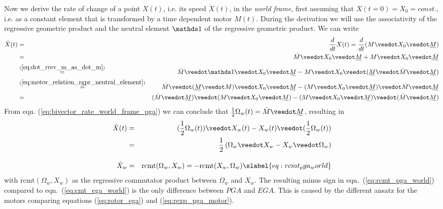 Now we derive the rate of change of a point $X(t)$, i.e. its speed $\dot{X}(t)$, in the
\emph{world frame}, first assuming that $X(t=0) = X_0 = const.$, i.e. as a constant
element that is transformed by a time dependent motor $M(t)$. During the derivation we
will use the associativity of the regressive geometric product and the neutral element
$\ps$ of the regressive geometric product. We can write
\begin{eqnarray*}
   \dot{X}(t) &=& \frac{d}{dt}X(t) =\frac{d}{dt}(M \veedot X_0 \veedot \rrev{M}) \\
              &=& \dot{M} \veedot X_0 \veedot \rrev{M} + M \veedot X_0 \veedot
                  \dot{\rrev{M}} \\
              &\overset{\mathrm{(\ref{eq:dot_rrev_m_as_dot_m})}}{=}& \dot{M} \veedot \ps
                  \veedot X_0 \veedot \rrev{M} -M \veedot X_0 \veedot
                  (\rrev{M}\veedot\dot{M}\veedot\rrev{M}) \\
              &\overset{\mathrm{(\ref{eq:motor_relation_rgpr_neutral_element})}}{=}&
                  \dot{M} \veedot (\rrev{M} \veedot M) \veedot X_0 \veedot \rrev{M} -(M
                  \veedot X_0 \veedot \rrev{M}) \veedot \dot{M} \veedot \rrev{M} \\
              &=& (\dot{M} \veedot \rrev{M}) \veedot (M\veedot X_0 \veedot \rrev{M})
                  -(M\veedot X_0 \veedot\rrev{M}) \veedot (\dot{M} \veedot \rrev{M})
\end{eqnarray*}
From eqn. (\ref{eq:bivector_rate_world_frame_pga}) we can conclude that
$\frac{1}{2}\Omega_w (t) = \dot{M} \veedot \rrev{M}$, resulting in
\begin{eqnarray}
   \dot{X}(t) &=&(\frac{1}{2}\Omega_w(t)) \veedot X_w(t) - X_w(t) \veedot
              (\frac{1}{2}\Omega_w(t)) \nonumber \\
              &=& \frac{1}{2}\left( \Omega_w \veedot X_w - X_w \veedot \Omega_w\right)
              \nonumber \\[10pt]
   \dot{X}_w  &=&  \mathrm{rcmt}(\Omega_w,X_w) = -\mathrm{rcmt}(X_w,\Omega_w)
   \slabel{eq:rcmt_pga_world} 
\end{eqnarray}
with $\mathrm{rcmt}(\Omega_w, X_w)$ as the regressive commutator product between
$\Omega_w$ and $X_w$. The resulting minus sign in eqn.~(\ref{eq:rcmt_pga_world}) compared
to eqn.~(\ref{eq:cmt_ega_world}) is the only difference between $PGA$ and $EGA$. This is
caused by the different ansatz for the motors comparing equations (\ref{eq:rotor_ega}) and
(\ref{eq:rexp_pga_motor}).\\


